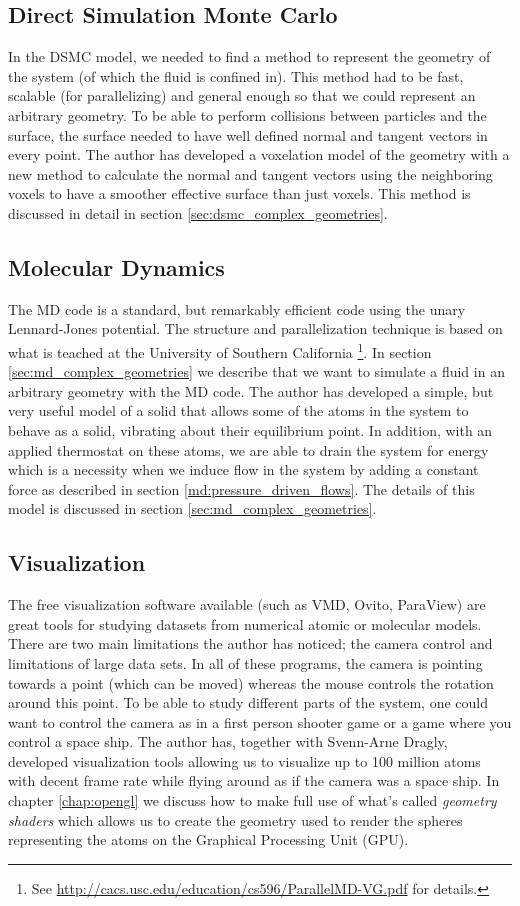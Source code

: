 \subsection{Direct Simulation Monte Carlo}
In the DSMC model, we needed to find a method to represent the geometry of the system (of which the fluid is confined in). This method had to be fast, scalable (for parallelizing) and general enough so that we could represent an arbitrary geometry. To be able to perform collisions between particles and the surface, the surface needed to have well defined normal and tangent vectors in every point. The author has developed a voxelation model of the geometry with a new method to calculate the normal and tangent vectors using the neighboring voxels to have a smoother effective surface than just voxels. This method is discussed in detail in section \ref{sec:dsmc_complex_geometries}.
\subsection{Molecular Dynamics}
The MD code is a standard, but remarkably efficient code using the unary Lennard-Jones potential. The structure and parallelization technique is based on what is teached at the University of Southern California \footnote{See \url{http://cacs.usc.edu/education/cs596/ParallelMD-VG.pdf} for details.}. In section \ref{sec:md_complex_geometries} we describe that we want to simulate a fluid in an arbitrary geometry with the MD code. The author has developed a simple, but very useful model of a solid that allows some of the atoms in the system to behave as a solid, vibrating about their equilibrium point. In addition, with an applied thermostat on these atoms, we are able to drain the system for energy which is a necessity when we induce flow in the system by adding a constant force as described in section \ref{md:pressure_driven_flows}. The details of this model is discussed in section \ref{sec:md_complex_geometries}.
\subsection{Visualization}
The free visualization software available (such as VMD, Ovito, ParaView) are great tools for studying datasets from numerical atomic or molecular models. There are two main limitations the author has noticed; the camera control and limitations of large data sets. In all of these programs, the camera is pointing towards a point (which can be moved) whereas the mouse controls the rotation around this point. To be able to study different parts of the system, one could want to control the camera as in a first person shooter game or a game where you control a space ship. The author has, together with Svenn-Arne Dragly, developed visualization tools allowing us to visualize up to 100 million atoms with decent frame rate while flying around as if the camera was a space ship. In chapter \ref{chap:opengl} we discuss how to make full use of what's called \textit{geometry shaders} which allows us to create the geometry used to render the spheres representing the atoms on the Graphical Processing Unit (GPU).